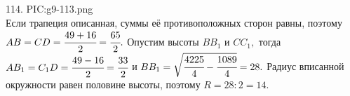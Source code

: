114. {{PIC:g9-113.png}}\\
Если трапеция описанная, суммы её противоположных сторон равны, поэтому\\ $AB=CD=\cfrac{49+16}{2}=\cfrac{65}{2}.$ Опустим высоты $BB_1$ и $CC_1,$ тогда $AB_1=C_1D=\cfrac{49-16}{2}=\cfrac{33}{2}$ и $BB_1=\sqrt{\cfrac{4225}{4}-\cfrac{1089}{4}}=28.$ Радиус вписанной окружности равен половине высоты, поэтому $R=28:2=14.$\\
